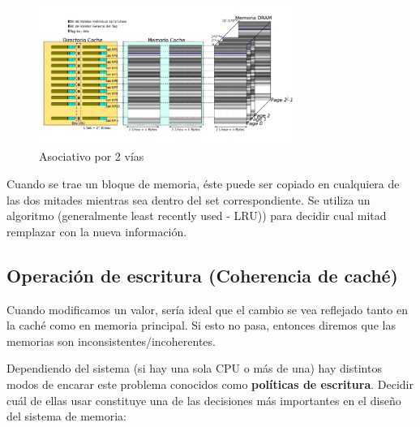 \begin{figure}[ht]
	\centering
	\includegraphics[width=0.75\textwidth]{imagenes/cache-asociativo-vias}
	\caption{Asociativo por 2 vías}
	\label{fig:asociativo-mapping}
\end{figure}

Cuando se trae un bloque de memoria, éste puede ser copiado en cualquiera de las dos mitades mientras sea dentro del set correspondiente. Se utiliza un algoritmo (generalmente least recently used - LRU)) para decidir cual mitad remplazar con la nueva información.

\subsection{Operación de escritura (Coherencia de caché)}

Cuando modificamos un valor, sería ideal que el cambio se vea reflejado tanto en la caché como en memoria principal. Si esto no pasa, entonces diremos que las memorias son inconsistentes/incoherentes.

Dependiendo del sistema (si hay una sola CPU o más de una) hay distintos modos de encarar este problema conocidos como \textbf{políticas de escritura}. Decidir cuál de ellas usar constituye una de las decisiones más importantes en el diseño del sistema de memoria:

